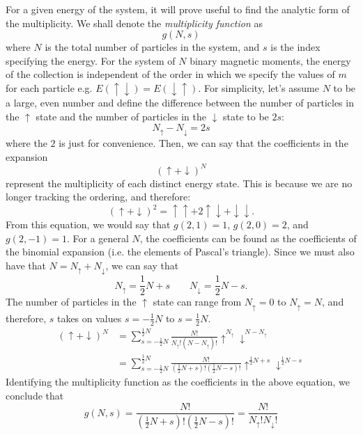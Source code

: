 \documentclass{article}
\begin{document}
For a given energy of the system, it will prove useful to find the analytic form of the
multiplicity. We shall denote the \textit{multiplicity function} as
\begin{equation}
  g(N, s)
\end{equation}
where $N$ is the total number of particles in the system, and $s$ is the index
specifying the energy. For the system of $N$ binary magnetic moments, the energy
of the collection is independent of the order in which we specify the values of
$m$ for each particle e.g. $E(\uparrow \downarrow) = E(\downarrow \uparrow)$.
For simplicity, let's assume $N$ to be a large, even number and define the
difference between the number of particles in the $\uparrow$ state and the
number of particles in the $\downarrow$ state to be $2s$: 
\begin{equation}
  N_{\uparrow} - N_{\downarrow} = 2s
\end{equation}
where the $2$ is just for convenience. Then, we can say that
the coefficients in the expansion
\begin{equation}
  (\uparrow  +\downarrow)^N
\end{equation}
represent the multiplicity of each distinct energy state. This is because we are
no longer tracking the ordering, and therefore: 
\begin{equation}
  (\uparrow+\downarrow)^2 = \uparrow\uparrow + 2\uparrow\downarrow + \downarrow\downarrow.
\end{equation}
From this equation, we would say that $g(2, 1) = 1$, $g(2, 0) = 2$, and
$g(2,-1)=1$. For a general $N$, the coefficients can be found as the
coefficients of the binomial expansion (i.e. the elements of Pascal's triangle).
Since we must also have that $N = N_{\uparrow}+N_{\downarrow}$, we can say
that
\begin{equation}
  N_{\uparrow} = \frac{1}{2}N+s \qquad N_{\downarrow} = \frac{1}{2}N-s. 
\end{equation}
The number of particles in the $\uparrow$ state can range from $N_\uparrow = 0$
to $N_\uparrow = N$, and therefore, $s$ takes on values $s=-\frac{1}{2}N$ to
$s=\frac{1}{2}N$. 
\begin{align}
  (\uparrow+\downarrow)^N &= \sum\limits_{s=-\frac{1}{2}N}^{\frac{1}{2}N}\frac{N!}{N_{\uparrow}!(N-N_{\uparrow})!}\uparrow^{N_\uparrow}\downarrow^{N-N_{\uparrow}} \\
                          &=\sum\limits_{s=-\frac{1}{2}N}^{\frac{1}{2}N}\frac{N!}{(\frac{1}{2}N+s)!(\frac{1}{2}N-s)!}\uparrow^{\frac{1}{2}N+s}\downarrow^{\frac{1}{2}N-s} 
\end{align}
Identifying the multiplicity function as the coefficients in the above equation,
we conclude that
\begin{equation}
  g(N,s) = \frac{N!}{(\frac{1}{2}N+s)!(\frac{1}{2}N-s)!} = \frac{N!}{N_{\uparrow}!N_{\downarrow}!}
\end{equation}
\end{document}
